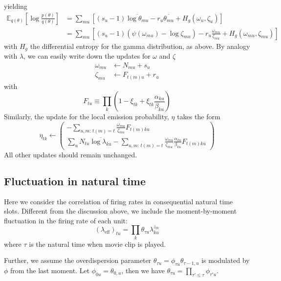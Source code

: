 \documentclass[11pt]{article}
\begin{document}
yielding
\begin{align}
    \mathbb{E}_{q(\theta)} \left[ \log \frac{p(\theta)}{q(\theta)} \right] &=
    \sum_{mu} \left[ (s_u - 1) \overline{\log \theta_{mu}} - r_u \overline{\theta_{mu}} + H_g(\omega_u, \zeta_u) \right] \\
    &= \sum_{mu} \left[ (s_u - 1) (\psi(\omega_{mu}) - \log \zeta_{mu}) - r_u \frac{\omega_{mu}}{\zeta_{mu}} + H_g(\omega_{mu}, \zeta_{mu}) \right]
\end{align}
with $H_g$ the differential entropy for the gamma distribution, as above. By analogy with $\lambda$, we can easily write down the updates for $\omega$ and $\zeta$
\begin{align}
    \omega_{mu} &\leftarrow N_{mu} + s_u \\
    \zeta_{mu} &\leftarrow F_{t(m)u} + r_u
\end{align}
with
\begin{equation}
    F_{tu} \equiv \prod_k \left( 1 - \xi_{tk} + \xi_{tk} \frac{\alpha_{ku}}{\beta_{ku}}\right)
\end{equation}
Similarly, the update for the local emission probability, $\eta$ takes the form
\begin{equation}
    \eta_{tk} \leftarrow
    \begin{pmatrix}
        -\sum_{u, m: \, t(m) = t} \frac{\omega_{mu}}{\zeta_{mu}} F_{t(m)ku} \\
        \sum_u N_{tu} \overline{\log \lambda_{ku}} -
        \sum_{u, m: \, t(m) = t} \frac{\omega_{mu}} {\zeta_{mu}}\frac{\alpha_{ku}}{\beta_{ku}} F_{t(m)ku}
    \end{pmatrix}
\end{equation}
All other updates should remain unchanged.

\subsection{Fluctuation in natural time}
Here we consider the correlation of firing rates in consequential natural time slots. Different from the discussion above, we include the moment-by-moment fluctuation in the firing rate of each unit:
\begin{equation}
    (\lambda_{\mathrm{eff}})_{tu} = \prod_k \theta_{\tau u} \lambda_{ku}^{z_{tk}}
\end{equation}
where $\tau$ is the natural time when movie clip is played.

Further, we assume the overdispersion parameter $\theta_{\tau u} = \phi_{\tau u} \theta_{\tau - 1, u}$ is modulated by $\phi$ from the last moment. Let $\phi_{0u} = \theta_{0, u}$, then we have $\theta_{\tau u} = \prod_{\tau' \le \tau} \phi_{\tau' u}$.
\end{document}
